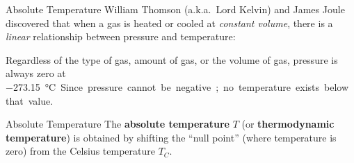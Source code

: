 \documentclass[12pt,aspectratio=169,dvipsnames]{beamer}
\begin{document}
\begin{frame}{Absolute Temperature}
  William Thomson (a.k.a.\ Lord Kelvin) and James Joule discovered that when a
  gas is heated or cooled at \emph{constant volume}, there is a \emph{linear}
  relationship between pressure and temperature:
  \begin{center}
  \end{center}
  Regardless of the type of gas, amount of gas, or the volume of gas, pressure
  is always zero at \SI{-273.15}\celsius. Since pressure cannot be negative;
  no temperature exists below that value.
\end{frame}



\begin{frame}{Absolute Temperature}
  The \textbf{absolute temperature} $T$ (or \textbf{thermodynamic temperature})
  is obtained by shifting the ``null point'' (where temperature is zero) from
  the Celsius temperature $T_C$.
  
\end{frame}
 
\end{document}
